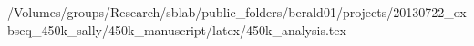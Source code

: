 /Volumes/groups/Research/sblab/public_folders/berald01/projects/20130722_oxbseq_450k_sally/450k_manuscript/latex/450k_analysis.tex